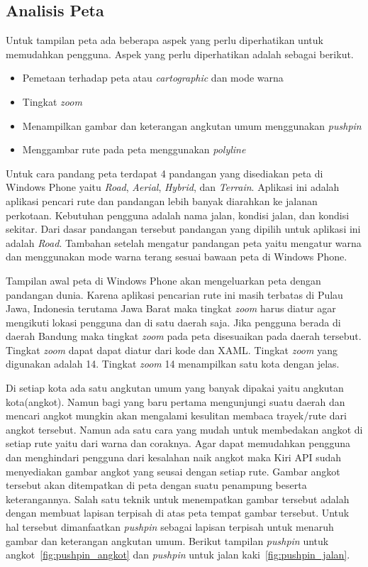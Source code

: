 \subsection{Analisis Peta}
\label{lab:Analisis Peta}
\hspace{0.5cm} Untuk tampilan peta ada beberapa aspek yang perlu diperhatikan untuk memudahkan pengguna. Aspek yang perlu diperhatikan adalah sebagai berikut.
\begin{itemize}
	\item Pemetaan terhadap peta atau \textit{cartographic} dan mode warna
	\item Tingkat \textit{zoom}
	\item Menampilkan gambar dan keterangan angkutan umum menggunakan \textit{pushpin}
	\item Menggambar rute pada peta menggunakan \textit{polyline}
\end{itemize}

Untuk cara pandang peta terdapat 4 pandangan yang disediakan peta di Windows Phone yaitu \textit{Road}, \textit{Aerial}, \textit{Hybrid}, dan \textit{Terrain}. Aplikasi ini adalah aplikasi pencari rute dan pandangan lebih banyak diarahkan ke jalanan perkotaan. Kebutuhan pengguna adalah nama jalan, kondisi jalan, dan kondisi sekitar. Dari dasar pandangan tersebut pandangan yang dipilih untuk aplikasi ini adalah \textit{Road}. Tambahan setelah mengatur pandangan peta yaitu mengatur warna dan menggunakan mode warna terang sesuai bawaan peta di Windows Phone.

Tampilan awal peta di Windows Phone akan mengeluarkan peta dengan pandangan dunia. Karena aplikasi pencarian rute ini masih terbatas di Pulau Jawa, Indonesia terutama Jawa Barat maka tingkat \textit{zoom} harus diatur agar mengikuti lokasi pengguna dan di satu daerah saja. Jika pengguna berada di daerah Bandung maka tingkat \textit{zoom} pada peta disesuaikan pada daerah tersebut. Tingkat \textit{zoom} dapat dapat diatur dari kode dan XAML. Tingkat \textit{zoom} yang digunakan adalah 14. Tingkat \textit{zoom} 14 menampilkan satu kota dengan jelas.

Di setiap kota ada satu angkutan umum yang banyak dipakai yaitu angkutan kota(angkot). Namun bagi yang baru pertama mengunjungi suatu daerah dan mencari angkot mungkin akan mengalami kesulitan membaca trayek/rute dari angkot tersebut. Namun ada satu cara yang mudah untuk membedakan angkot di setiap rute yaitu dari warna dan coraknya. Agar dapat memudahkan pengguna dan menghindari pengguna dari kesalahan naik angkot maka Kiri API sudah menyediakan gambar angkot yang seusai dengan setiap rute. Gambar angkot tersebut akan ditempatkan di peta dengan suatu penampung beserta keterangannya. Salah satu teknik untuk menempatkan gambar tersebut adalah dengan membuat lapisan terpisah di atas peta tempat gambar tersebut. Untuk hal tersebut dimanfaatkan \textit{pushpin} sebagai lapisan terpisah untuk menaruh gambar dan keterangan angkutan umum. Berikut tampilan \textit{pushpin} untuk angkot~\ref{fig:pushpin_angkot} dan \textit{pushpin} untuk jalan kaki~\ref{fig:pushpin_jalan}.

